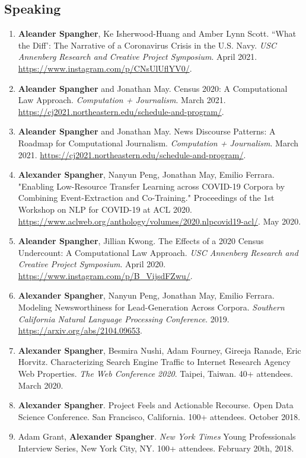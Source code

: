 \documentclass[margin]{res}
\begin{document}
\begin{resume}
\section{Speaking}
\begin{enumerate}
	\item \textbf{Aleander Spangher}, Ke Isherwood-Huang and Amber Lynn Scott. ``What the Diff': The Narrative of a Coronavirus Crisis in the U.S. Navy. \textit{USC Annenberg Research and Creative Project Symposium}. April 2021. \url{https://www.instagram.com/p/CNsUlUflYV0/}.
	\item \textbf{Aleander Spangher} and Jonathan May. Census 2020: A Computational Law Approach. \textit{Computation + Journalism}. March 2021. \url{https://cj2021.northeastern.edu/schedule-and-program/}.
	\item \textbf{Aleander Spangher} and Jonathan May. News Discourse Patterns: A Roadmap for Computational Journalism. \textit{Computation + Journalism}. March 2021. \url{https://cj2021.northeastern.edu/schedule-and-program/}.
	\item \textbf{Alexander Spangher}, Nanyun Peng, Jonathan May, Emilio Ferrara. "Enabling Low-Resource Transfer Learning across COVID-19 Corpora by Combining Event-Extraction and Co-Training." Proceedings of the 1st Workshop on NLP for COVID-19 at ACL 2020. \url{https://www.aclweb.org/anthology/volumes/2020.nlpcovid19-acl/}. May 2020.
	\item \textbf{Aleander Spangher}, Jillian Kwong. The Effects of a 2020 Census Undercount: A Computational Law Approach. \textit{USC Annenberg Research and Creative Project Symposium}. April 2020. \url{https://www.instagram.com/p/B_VijsdFZwu/}.
	\item \textbf{Alexander Spangher}, Nanyun Peng, Jonathan May, Emilio Ferrara. Modeling Newsworthiness for Lead-Generation Across Corpora. \textit{Southern California Natural Language Processing Conference}. 2019. \url{https://arxiv.org/abs/2104.09653}.
	\item \textbf{Alexander Spangher}, Besmira Nushi, Adam Fourney, Gireeja Ranade, Eric Horvitz. Characterizing Search Engine Traffic to Internet Research Agency Web Properties. \textit{The Web Conference 2020}. Taipei, Taiwan. 40+ attendees. March 2020.
	\item \textbf{Alexander Spangher}. Project Feels and Actionable Recourse. Open Data Science Conference. San Francisco, California. 100+ attendees. October 2018.
	\item Adam Grant, \textbf{Alexander Spangher}. \textit{New York Times} Young Professionals Interview Series, New York City, NY. 100+ attendees. February 20th, 2018.

\end{enumerate}
\end{resume}
\end{document}
